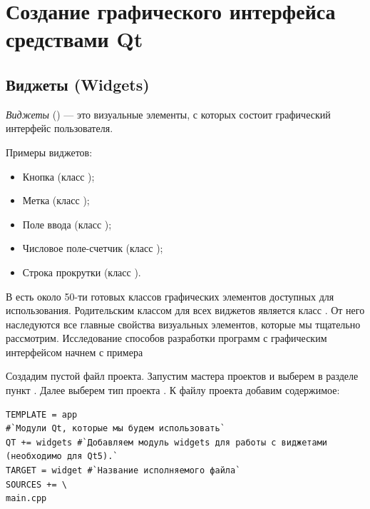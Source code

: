 \chapter[Создание графического интерфейса средствами Qt]{Создание графического интерфейса средствами Qt}
\section[Виджеты (Widgets)]{Виджеты (Widgets)}\label{ch13:1}
\emph{Виджеты} () --- это визуальные элементы, с которых состоит графический интерфейс
пользователя.

Примеры виджетов:

\begin{itemize}
\item Кнопка (класс );
\item Метка (класс );
\item Поле ввода (класс );
\item Числовое поле-счетчик (класс );
\item Строка прокрутки (класс ).
\end{itemize}

В  есть около 50-ти готовых классов графических элементов доступных для использования. Родительским классом для всех
виджетов является  класс . От него наследуются все главные свойства визуальных
элементов, которые мы тщательно рассмотрим. Исследование способов разработки программ с графическим интерфейсом начнем
с примера

Создадим пустой файл проекта. Запустим мастера проектов и выберем в разделе
 пункт . Далее выберем тип проекта
. К файлу проекта добавим содержимое:
\begin{lstlisting}
TEMPLATE = app
#`Модули Qt, которые мы будем использовать`
QT += widgets #`Добавляем модуль widgets для работы с виджетами (необходимо для Qt5).`
TARGET = widget #`Название исполняемого файла`
SOURCES += \
main.cpp
\end{lstlisting}

